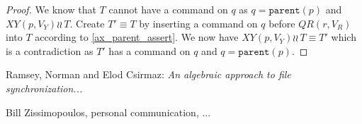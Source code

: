 \documentclass[12pt]{article}
\newcommand{\parent}{\mathtt{parent}}
\newcommand{\fscommand}[2]{{#1#2}}
\newcommand{\cxy}{\fscommand{X}{Y}}
\newcommand{\cqr}{\fscommand{Q}{R}}
\newcommand{\indep}{\wr\!\!\wr\,} %
\newcommand{\recchar}[3]{{#1}^{#3}_{\mathcal{R}|{#2}}}
\newcommand{\reca}{\recchar{A}{B}{}} %
\theoremstyle{definition}
\begin{document}
\begin{proof}
We know that $T$ cannot have a command on $q$ as $q=\parent(p)$ and $\cxy(p,V_Y)\indep T$.
Create $T'\equiv T$ by inserting a command on $q$ before $\cqr(r,V_R)$
into $T$ according to \cref{ax_parent_assert}.
We now have $\cxy(p,V_Y)\indep T\equiv T'$ which is a contradiction as
$T'$ has a command on $q$ and $q=\parent(p)$.

\end{proof}



\begin{thebibliography}{99}

 Ramsey, Norman and Elod Csirmaz: {\it An algebraic approach to
file synchronization...}

 Bill Zissimopoulos, personal communication, ...

\end{thebibliography}
\end{document}
